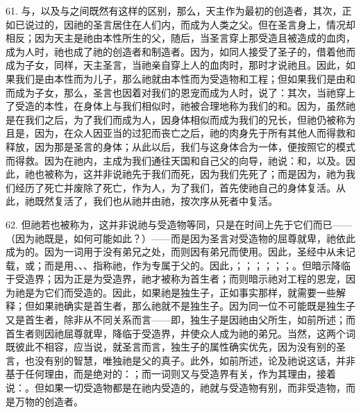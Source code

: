 61. 与，以及与之间既然有这样的区别，那么，天主作为最初的创造者，其次，正如已说过的，因祂的圣言居住在人们内，而成为人类之父。但在圣言身上，情况却相反；因为天主是祂由本性所生的父，随后，当圣言穿上那受造且被造成的血肉，成为人时，祂也成了祂的创造者和制造者。因为，如同人接受了圣子的，借着他而成为子女，同样，天主圣言，当祂亲自穿上人的血肉时，那时才说祂且。因此，如果我们是由本性而为儿子，那么祂就由本性而为受造物和工程；但如果我们是由和而成为子女，那么，圣言也因着对我们的恩宠而成为人时，说了：其次，当祂穿上了受造的本性，在身体上与我们相似时，祂被合理地称为我们的和。因为，虽然祂是在我们之后，为了我们而成为人，因身体相似而成为我们的兄长，但祂仍被称为且是，因为，在众人因亚当的过犯而丧亡之后，祂的肉身先于所有其他人而得救和释放，因为那是圣言的身体；从此以后，我们与这身体合为一体，便按照它的模式而得救。因为在祂内，主成为我们通往天国和自己父的向导，祂说：和，以及。因此，祂也被称为，这并非说祂先于我们而死，因为我们先死了；而是因为，祂为我们经历了死亡并废除了死亡，作为人，为了我们，首先使祂自己的身体复活。从此，祂既然复活了，我们也从祂并由祂，按次序从死者中复活。\par

62. 但祂若也被称为，这并非说祂与受造物等同，只是在时间上先于它们而已——（因为祂既是，如何可能如此？）——而是因为圣言对受造物的屈尊就卑，祂依此成为的。因为一词用于没有弟兄之处，而则因有弟兄而使用。因此，圣经中从未记载，或；而是用、、、指称祂，作为专属于父的。因此，；；；；；；。但暗示降临于受造界；因为正是为受造界，祂才被称为首生者；而则暗示祂对工程的恩宠，因为祂是为它们而受造的。因此，如果祂是独生子，正如事实那样，就需要一些解释；但如果祂确实是首生者，那么祂就不是独生子。因为同一位不可能既是独生子又是首生者，除非从不同关系而言——即，独生子是因祂由父所生，如前所述；而首生者则因祂屈尊就卑，降临于受造界，并使众人成为祂的弟兄。当然，这两个词既彼此不相容，应当说，就圣言而言，独生子的属性确实优先，因为没有别的圣言，也没有别的智慧，唯独祂是父的真子。此外，如前所述，论及祂说这话，并非基于任何理由，而是绝对的：；而一词则又与受造界有关，作为其理由，接着说：。但如果一切受造物都是在祂内受造的，祂就与受造物有别，而非受造物，而是万物的创造者。\par

